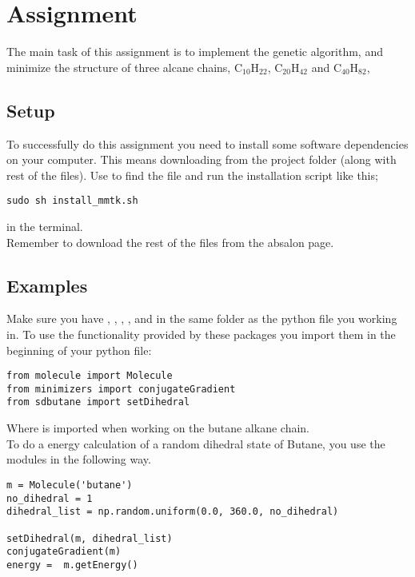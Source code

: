 \documentclass{article}
\begin{document}
\newpage
\section{Assignment}

The main task of this assignment is to implement
the genetic algorithm, and minimize the structure of 
three alcane chains,
C$_{10}$H$_{22}$,
C$_{20}$H$_{42}$ and
C$_{40}$H$_{82}$,

\subsection{Setup}

To successfully do this assignment you need to install
some software dependencies on your computer.
This means downloading  from
the project folder (along with rest of the files).
Use  to find the file and run the installation script like this;


\begin{lstlisting}
sudo sh install_mmtk.sh
\end{lstlisting}

in the terminal.\\

Remember to download the rest of the files from the
absalon page.


\subsection{Examples}

Make sure you have
,
,
,
,
 and
in the same folder as the python
file you working in. To use the functionality 
provided by these packages you import them
in the beginning of your python file:

\begin{lstlisting}
from molecule import Molecule
from minimizers import conjugateGradient
from sdbutane import setDihedral
\end{lstlisting}

Where  is imported when working on
the butane alkane chain.\\

To do a energy calculation of a random dihedral state of Butane,
you use the modules in the following way.

\begin{lstlisting}
m = Molecule('butane')
no_dihedral = 1
dihedral_list = np.random.uniform(0.0, 360.0, no_dihedral)

setDihedral(m, dihedral_list)
conjugateGradient(m)
energy =  m.getEnergy()
\end{lstlisting}
\end{document}
